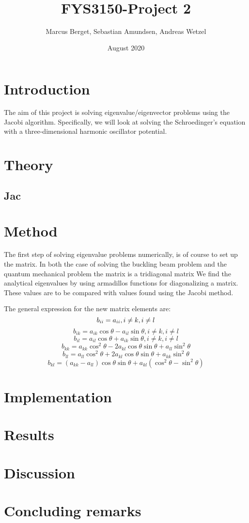 \documentclass[norsk,a4paper,12pt]{article}
\begin{document}
\title{FYS3150-Project 2}
\author{Marcus Berget, Sebastian Amundsen, Andreas Wetzel}
\date{August 2020}
\maketitle

\begin{abstract}

\end{abstract}

\section{Introduction}

The aim of this project is solving eigenvalue/eigenvector problems using the Jacobi algorithm. Specifically, we will look at solving the Schroedinger's equation with a three-dimensional harmonic oscillator potential. 

\section{Theory}
\subsection{Jac}

\section{Method}

The first step of solving eigenvalue problems numerically, is of course to set up the matrix. In both the case of solving the buckling beam problem and the quantum mechanical problem the matrix is a tridiagonal matrix
We find the analytical eigenvalues by using armadillos functions for diagonalizing a matrix. These values are to be compared with values found using the Jacobi method. 


The general expression for the new matrix elements are:
$$
b_{ii}=a_{ii}, i\neq k, i\neq l \\
$$
$$
b_{ik}=a_{ik}\cos \theta - a_{il}\sin \theta, i\neq k, i\neq l
$$
$$
b_{il}=a_{il}\cos\theta+a_{ik}\sin\theta, i\neq k, i\neq l
$$
$$
b_{kk}=a_{kk} \cos^2\theta - 2a_{kl}\cos\theta \sin\theta + a_{ll}\sin^2\theta
$$
$$
b_{ll}=a_{ll}\cos^2\theta+2a_{kl}\cos\theta \sin\theta + a_{kk}\sin^2\theta
$$
\begin{equation}
b_{kl} = (a_{kk}-a_{ll})\cos\theta\sin\theta+a_{kl}(\cos^2\theta-\sin^2\theta)
 \label{eq:Jacob}
 \end{equation}

\section{Implementation}



\section{Results}

\section{Discussion}


\section{Concluding remarks}


\end{document}
